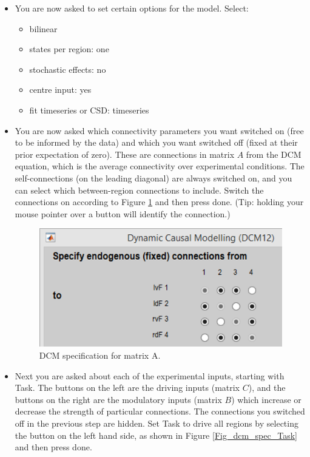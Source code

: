 \documentclass{article}
\begin{document}
\begin{itemize}
\item You are now asked to set certain options for the model. Select: 

\begin{itemize}
    \item bilinear
    \item states per region: one
    \item stochastic effects: no
    \item centre input: yes
    \item fit timeseries or CSD: timeseries
\end{itemize}

\item You are now asked which connectivity parameters you want switched on (free to be informed by the data) and which you want switched off (fixed at their prior expectation of zero). These are connections in matrix \(A\) from the DCM equation, which is the average connectivity over experimental conditions. The self-connections (on the leading diagonal) are always switched on, and you can select which between-region connections to include. Switch the connections on according to Figure \ref{Fig_dcm_spec_A} and then press done. (Tip: holding your mouse pointer over a button will identify the connection.)

\begin{figure}[ht]
\begin{center}
\includegraphics{"Fig_dcm_spec_A"}
\caption{DCM specification for matrix A.\label{Fig_dcm_spec_A}}
\end{center}
\end{figure}

\item Next you are asked about each of the experimental inputs, starting with Task. The buttons on the left are the driving inputs (matrix \(C\)), and the buttons on the right are the modulatory inputs (matrix \(B\)) which increase or decrease the strength of particular connections. The connections you switched off in the previous step are hidden. Set Task to drive all regions by selecting the button on the left hand side, as shown in Figure \ref{Fig_dcm_spec_Task} and then press done.


\end{itemize}
\end{document}
